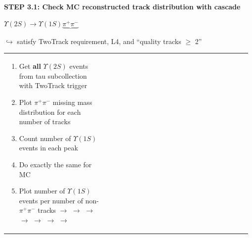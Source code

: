 \documentclass[landscape]{article}
\begin{document}
\vfill

\pagebreak

\vspace{1 cm}

{\bf STEP 3.1: Check MC reconstructed track distribution with cascade}

\vfill

$\Upsilon(2S) \to \Upsilon(1S) \underbrace{\pi^+\pi^-}$

\hspace{5.5 cm} $\hookrightarrow$ satisfy TwoTrack requirement, L4, and ``quality tracks $\ge$ 2''

\vfill

\begin{tabular}{p{0.4\linewidth} p{0.03\linewidth} p{0.55\linewidth}}
  \begin{minipage}{\linewidth}

  \begin{enumerate}

    \item Get {\bf all} $\Upsilon(2S)$ events from tau subcollection with TwoTrack trigger

    \bigskip
    \item Plot $\pi^+\pi^-$ missing mass distribution for each number of tracks



    \bigskip
    \item Count number of $\Upsilon(1S)$ events in each peak

    \bigskip
    \item Do exactly the same for MC

    \bigskip
    \item Plot number of $\Upsilon(1S)$ events per number of non-$\pi^+\pi^-$ tracks $\longrightarrow$ $\longrightarrow$ $\longrightarrow$ $\longrightarrow$ $\longrightarrow$ $\longrightarrow$ $\longrightarrow$

  \end{enumerate}


\end{minipage}
\end{tabular}
\end{document}
